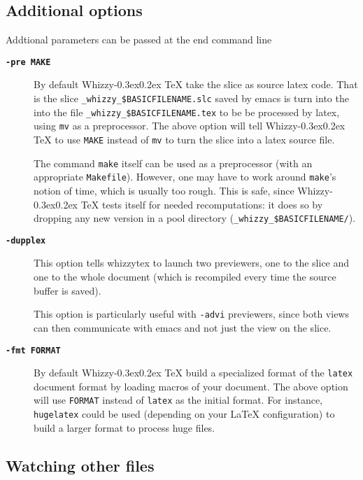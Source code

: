 \documentclass{article}
\let \lst \verb
\def \whizzy{{Whizzy\kern -0.3ex\raise 0.2ex \hbox{\TeX}}}
\begin{document}
\subsection {Additional options}

Addtional parameters can be passed at the end command line

\begin{description}
\item[{\bf {\tt -pre MAKE}}]\indent
\label {make}

By default {\whizzy} take the slice as source latex code. 
That is the slice 
\lst"_whizzy_$BASICFILENAME.slc" saved by emacs is turn into the 
into the file \lst"_whizzy_$BASICFILENAME.tex" to be be processed by latex,
using \lst"mv" as a preprocessor.  The above option will tell {\whizzy} to
use \lst"MAKE" instead of \lst"mv" to turn the slice into a latex source
file.

The command \lst"make" itself can be used as a preprocessor (with an
appropriate \lst"Makefile").  However, one may have to work around
\lst"make"'s notion of time, which is usually too rough. 
This is safe, since
{\whizzy} tests itself for needed recomputations: it does so by dropping any
new version in a pool directory (\lst"_whizzy_$BASICFILENAME/"). %

\item[{\bf {\tt -dupplex}}]\indent
\label {dupplex}

This option tells whizzytex to launch two previewers, one to the slice and
one to the whole document (which is recompiled every time the source buffer
is saved).

This option is particularly useful with \lst"-advi" previewers, since both
views can then communicate with emacs and not just the view on the slice.

\item[{\bf {\tt -fmt FORMAT}}]\indent

By default {\whizzy} build a specialized format of the \lst"latex" document
format by loading macros of your document.  The above option will use
\lst"FORMAT" instead of \lst"latex" as the initial format. For instance,
\lst"hugelatex" could be used (depending on your {\LaTeX} configuration) to
build a larger format to process huge files.

\end{description}



\subsection {Watching other files}
\end{document}
